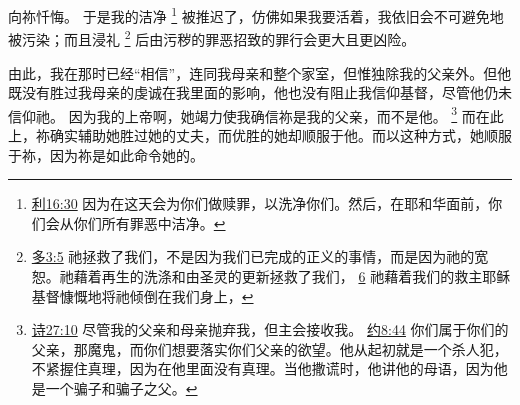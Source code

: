 \documentclass[12pt, a4paper, oneside]{ctexart}
\begin{document}
    向祢忏悔。
    于是我的洁净
    \footnote {
        \href{https://biblehub.com/leviticus/16-30.htm}{利16:30} 因为在这天会为你们做赎罪，以洗净你们。然后，在耶和华面前，你们会从你们所有罪恶中洁净。
    }
    被推迟了，仿佛如果我要活着，我依旧会不可避免地被污染；而且浸礼
    \footnote {
        \href{https://biblehub.com/titus/3-5.htm}{多3:5} 祂拯救了我们，不是因为我们已完成的正义的事情，而是因为祂的宽恕。祂藉着再生的洗涤和由圣灵的更新拯救了我们，
        \href{https://biblehub.com/titus/3-6.htm}{6} 祂藉着我们的救主耶稣基督慷慨地将祂倾倒在我们身上，
    }
    后由污秽的罪恶招致的罪行会更大且更凶险。

    由此，我在那时已经“相信”，连同我母亲和整个家室，但惟独除我的父亲外。但他既没有胜过我母亲的虔诚在我里面的影响，他也没有阻止我信仰基督，尽管他仍未信仰祂。
    因为我的上帝啊，她竭力使我确信祢是我的父亲，而不是他。
    \footnote {
        \href{https://biblehub.com/psalms/27-10.htm}{诗27:10} 尽管我的父亲和母亲抛弃我，但主会接收我。
        \href{https://biblehub.com/john/8-44.htm}{约8:44} 你们属于你们的父亲，那魔鬼，而你们想要落实你们父亲的欲望。他从起初就是一个杀人犯，不紧握住真理，因为在他里面没有真理。当他撒谎时，他讲他的母语，因为他是一个骗子和骗子之父。
    }
    而在此上，祢确实辅助她胜过她的丈夫，而优胜的她却顺服于他。而以这种方式，她顺服于祢，因为祢是如此命令她的。
\end{document}
